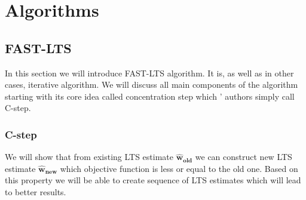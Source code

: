 \chapter{Algorithms}



\section{FAST-LTS}
In this section we will introduce FAST-LTS algorithm\cite{rouss:2000}. 
It is, as well as in other cases, iterative algorithm. We will discuss all main components
of the algorithm starting with its core idea called concentration step which '
authors simply call C-step.


\subsection{C-step}
We will show that from existing LTS estimate $\boldsymbol{\hat{w}_{old}}$ we 
can construct new LTS estimate $\boldsymbol{\hat{w}_{new}}$ which objective 
function is less or equal to the old one. Based on this property we will be able 
to create sequence of LTS estimates which will lead to better results.




